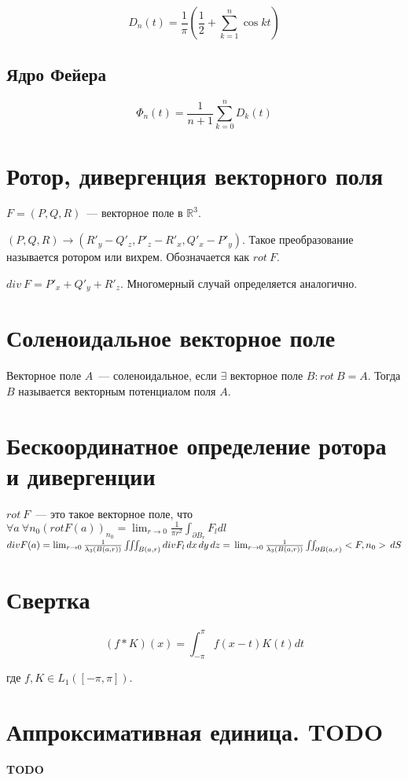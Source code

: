 \documentclass[paper=a4, fontsize=17pt]{article}
\begin{document}
	$$ D_n(t) = \frac{1}{\pi}( \frac{1}{2} + \sum_{k = 1}^{n} \cos kt) $$

	\subsection{Ядро Фейера}

	$$ \Phi_n(t) = \frac{1}{n+1} \sum_{k = 0}^{n} D_k(t) $$

	\section{Ротор, дивергенция векторного поля}
    $F = (P, Q, R)$~--- векторное поле в $\mathds{R}^3$.

	$(P, Q, R) \rightarrow (R'_y - Q'_z, P'_z - R'_x, Q'_x - P'_y)$. Такое преобразование называется ротором или вихрем. Обозначается как $rot\ F$.

	$div\ F = P'_x + Q'_y + R'_z$. Многомерный случай определяется аналогично.

	\section{Соленоидальное векторное поле}
	Векторное поле $A$~--- соленоидальное, если $\exists$ векторное поле $B: rot\ B = A$. Тогда $B$ называется векторным потенциалом поля $A$.

	\section{Бескоординатное определение ротора и дивергенции}
	$rot\ F$~--- это такое векторное поле, что $\forall a \ \forall n_0 (rot F(a))_{n_0} = \lim_{r\to 0} \frac{1}{\pi r^2} \int_{\partial B_r} F_ldl$
\\

	$div F(a) = \lim_{r\to 0} \frac{1}{\lambda_3(B(a,r))} \iiint_{B(a,r)} div F_l \,dx\,dy\,dz = \\ \lim_{r\to 0} \frac{1}{\lambda_3(B(a,r))} \iint_{\partial B(a,r)} <F, n_0>\,dS$

	\section{Свертка}

	$$ (f \ast K)(x) = \int_{-\pi}^{\pi} f(x-t)K(t) dt$$

	где $ f, K \in L_1([-\pi, \pi])$.

\section{Аппроксимативная единица. TODO}
	{\color{red} \textbf{TODO}}
\end{document}
